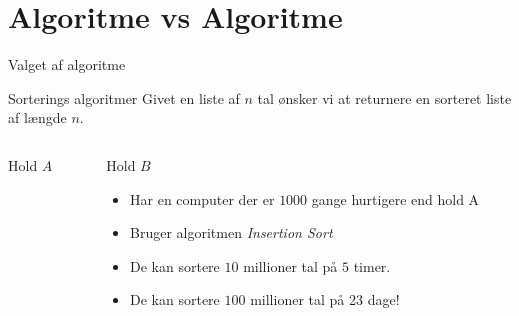 \documentclass[12pt,t]{beamer}
\begin{document}
\section{Algoritme vs Algoritme}
    \begin{frame}[t]{Valget af algoritme}
        \begin{exampleblock}{Sorterings algoritmer}
            Givet en liste af $n$ tal ønsker vi at returnere en sorteret liste
            af længde $n$.
        \end{exampleblock}
        \pause
        \vspace{-2em}
        \begin{columns}
            \begin{column}{0.5\textwidth}
                \begin{block}{Hold $A$}
                    \begin{itemize}
                    \end{itemize}
                \end{block}
            \end{column}
            \begin{column}{0.5\textwidth}
                \begin{block}{Hold $B$}
                    \begin{itemize}[<+->]
                    \item Har en computer der er $1000$ gange hurtigere end
                    hold A
                    \item Bruger algoritmen \emph{Insertion Sort}
                    \item De kan sortere $10$ millioner tal på $5$ timer.
                    \item De kan sortere $100$ millioner tal på \alert{23 dage!}
                    \end{itemize}
                \end{block}
            \end{column}
        \end{columns}
    \end{frame}
\end{document}
